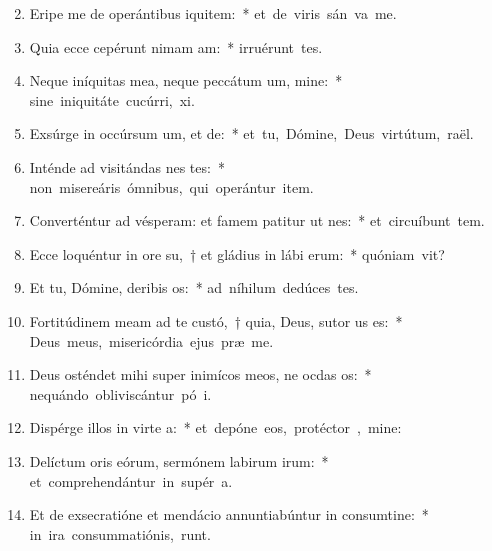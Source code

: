 \begin{flushleft}
\begin{enumerate}[leftmargin=*]
\setcounter{enumi}{1}

\item Eripe me de operántibus iquitem:~* \mbox{et de viris sán va me.}
\item Quia ecce cepérunt nimam am:~* \mbox{irruérunt   tes.}
\item Neque iníquitas mea, neque peccátum um, mine:~* \mbox{sine iniquitáte cucúrri,  xi.}
\item Exsúrge in occúrsum um, et de:~* \mbox{et tu, Dómine, Deus virtútum,  raël.}
\item Inténde ad visitándas nes tes:~* \mbox{non misereáris ómnibus, qui operántur item.}
\item Converténtur ad vésperam: et famem patitur ut nes:~* \mbox{et circuíbunt tem.}
\item Ecce loquéntur in ore su,~† et gládius in lábi erum:~* \mbox{quóniam  vit?}
\item Et tu, Dómine, deribis os:~* \mbox{ad níhilum dedúces  tes.}
\item Fortitúdinem meam ad te custó,~† quia, Deus, sutor us es:~* \mbox{Deus meus, misericórdia ejus præ me.}
\item Deus osténdet mihi super inimícos meos, ne ocdas os:~* \mbox{nequándo obliviscántur pó i.}
\item Dispérge illos in virte a:~* \mbox{et depóne eos, protéctor , mine:}
\item Delíctum oris eórum, sermónem labirum irum:~* \mbox{et comprehendántur in supér a.}
\item Et de exsecratióne et mendácio annuntiabúntur in consumtine:~* \mbox{in ira consummatiónis,   runt.}

\end{enumerate}
\end{flushleft}

